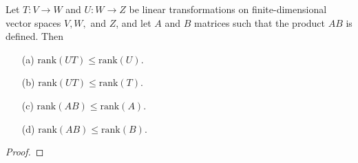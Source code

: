 \begin{theorem}
    Let \( T: V \to W  \) and \( U: W \to Z  \) be linear transformations on finite-dimensional vector spaces \( V,W,  \) and \( Z  \), and let \( A  \) and \( B  \) matrices such that the product \( AB  \) is defined. Then
    \begin{enumerate}
        \item[(a)] \( \text{rank}(UT) \leq \text{rank}(U) \).
        \item[(b)] \( \text{rank}(UT) \leq \text{rank}(T) \).
        \item[(c)] \( \text{rank}(AB) \leq \text{rank}(A) \).
        \item[(d)] \( \text{rank}(AB) \leq \text{rank}(B) \).
    \end{enumerate}
\end{theorem}
\begin{proof}

\end{proof}

